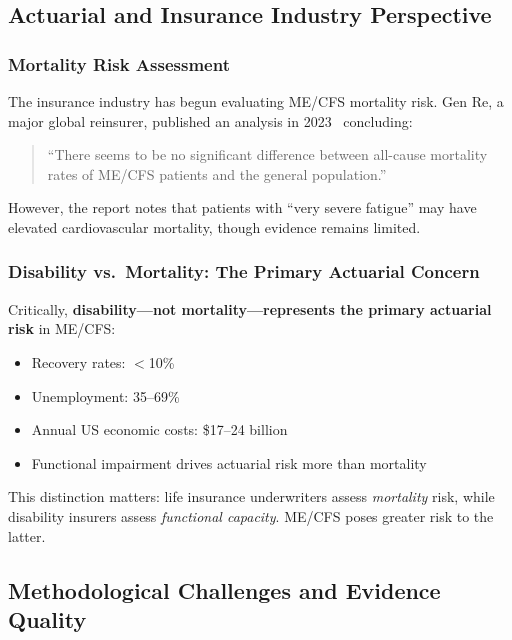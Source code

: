 \subsection{Actuarial and Insurance Industry Perspective}
\label{subsec:actuarial-perspective}

\subsubsection{Mortality Risk Assessment}

The insurance industry has begun evaluating ME/CFS mortality risk. Gen Re, a major global reinsurer, published an analysis in 2023~\cite{GenRe2023} concluding:

\begin{quote}
``There seems to be no significant difference between all-cause mortality rates of ME/CFS patients and the general population.''
\end{quote}

However, the report notes that patients with ``very severe fatigue'' may have elevated cardiovascular mortality, though evidence remains limited.

\subsubsection{Disability vs.\ Mortality: The Primary Actuarial Concern}

Critically, \textbf{disability---not mortality---represents the primary actuarial risk} in ME/CFS:

\begin{itemize}
    \item Recovery rates: $<$10\%
    \item Unemployment: 35--69\%
    \item Annual US economic costs: \$17--24 billion
    \item Functional impairment drives actuarial risk more than mortality
\end{itemize}

This distinction matters: life insurance underwriters assess \textit{mortality} risk, while disability insurers assess \textit{functional capacity}. ME/CFS poses greater risk to the latter.

\subsection{Methodological Challenges and Evidence Quality}
\label{subsec:mortality-methodology}

